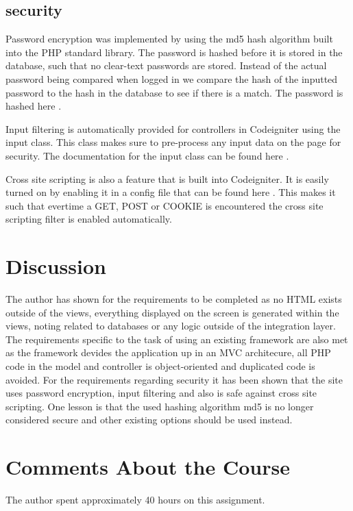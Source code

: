 \documentclass[a4paper]{scrartcl}
\begin{document}
\subsection{security}
Password encryption was implemented by using the md5 hash algorithm built into the PHP standard library. The password is hashed before it is stored in the database, such that no clear-text passwords are stored. Instead of the actual password being compared when logged in we compare the hash of the inputted password to the hash in the database to see if there is a match. The password is hashed here \citet{kimblad_git_2019-2}.

Input filtering is automatically provided for controllers in Codeigniter using the input class. This class makes sure to pre-process any input data on the page for security. The documentation for the input class can be found here \citet{codeignite}.

Cross site scripting is also a feature that is built into Codeigniter. It is easily turned on by enabling it in a config file that can be found here \citet{cxx}. This makes it such that evertime a GET, POST or COOKIE is encountered the cross site scripting filter is enabled automatically.

\section{Discussion}

The author has shown for the requirements to be completed as no HTML exists outside of the views, everything displayed on the screen is generated within the views, noting related to databases or any logic outside of the integration layer. The requirements specific to the task of using an existing framework are also met as the framework devides the application up in an MVC architecure, all PHP code in the model and controller is object-oriented and duplicated code is avoided.
For the requirements regarding security it has been shown that the site uses password encryption, input filtering and also is safe against cross site scripting.
One lesson is that the used hashing algorithm md5 is no longer considered secure and other existing options should be used instead.


\printbibliography

\section{Comments About the Course}
The author spent approximately 40 hours on this assignment.
\end{document}
